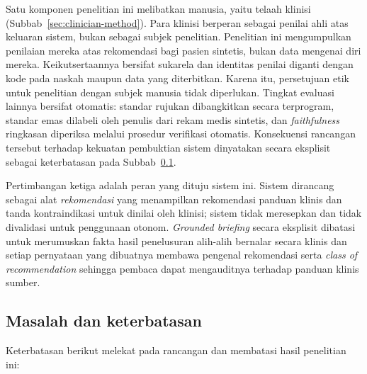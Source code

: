 Satu komponen penelitian ini melibatkan manusia, yaitu telaah klinisi
(Subbab~\ref{sec:clinician-method}). Para klinisi berperan sebagai penilai ahli atas keluaran
sistem, bukan sebagai subjek penelitian. Penelitian ini mengumpulkan penilaian mereka atas
rekomendasi bagi pasien sintetis, bukan data mengenai diri mereka. Keikutsertaannya bersifat
sukarela dan identitas penilai diganti dengan kode pada naskah maupun data yang diterbitkan.
Karena itu, persetujuan etik untuk penelitian dengan subjek manusia tidak diperlukan. Tingkat
evaluasi lainnya bersifat otomatis: standar rujukan dibangkitkan secara terprogram, standar
emas dilabeli oleh penulis dari rekam medis sintetis, dan \emph{faithfulness} ringkasan
diperiksa melalui prosedur verifikasi otomatis. Konsekuensi rancangan tersebut terhadap
kekuatan pembuktian sistem dinyatakan secara eksplisit sebagai keterbatasan pada
Subbab~\ref{sec:limitations}.

Pertimbangan ketiga adalah peran yang dituju sistem ini. Sistem dirancang sebagai alat
\emph{rekomendasi} yang menampilkan rekomendasi panduan klinis dan tanda kontraindikasi untuk
dinilai oleh klinisi; sistem tidak meresepkan dan tidak divalidasi untuk penggunaan otonom.
\emph{Grounded briefing} secara eksplisit dibatasi untuk merumuskan fakta hasil penelusuran
alih-alih bernalar secara klinis dan setiap pernyataan yang dibuatnya membawa pengenal
rekomendasi serta \emph{class of recommendation} sehingga pembaca dapat mengauditnya terhadap
panduan klinis sumber.

\subsection{Masalah dan keterbatasan}
\label{sec:limitations}
Keterbatasan berikut melekat pada rancangan dan membatasi hasil penelitian ini:


